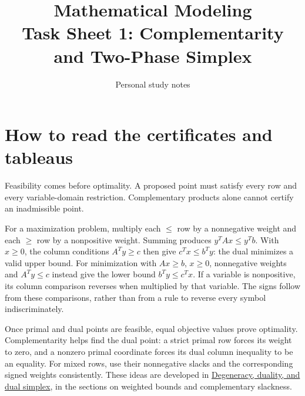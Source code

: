 \documentclass[11pt,a4paper]{article}
\title{\textbf{Mathematical Modeling}\\[2mm]
\large Task Sheet 1: Complementarity and Two-Phase Simplex}
\author{Personal study notes}
\date{}
\begin{document}
\maketitle
\tableofcontents

\section{How to read the certificates and tableaus}\label{sec:notation}
Feasibility comes before optimality. A proposed point must satisfy every row
and every variable-domain restriction. Complementary products alone cannot
certify an inadmissible point.

For a maximization problem, multiply each $\leq$ row by a nonnegative
weight and each $\geq$ row by a nonpositive weight. Summing produces
$y^TAx\leq y^Tb$. With $x\geq0$, the column conditions $A^Ty\geq c$
then give $c^Tx\leq b^Ty$: the dual minimizes a valid upper bound.
For minimization with $Ax\geq b$, $x\geq0$, nonnegative weights and
$A^Ty\leq c$ instead give the lower bound $b^Ty\leq c^Tx$.
If a variable is nonpositive, its column comparison reverses when multiplied
by that variable. The signs follow from these comparisons, rather than from
a rule to reverse every symbol indiscriminately.

Once primal and dual points are feasible, equal objective values prove
optimality. Complementarity helps find the dual point: a strict primal row
forces its weight to zero, and a nonzero primal coordinate forces its dual
column inequality to be an equality. For mixed rows, use their nonnegative
slacks and the corresponding signed weights consistently. These ideas are
developed in
\href{../lectures/04-degeneracy-and-duality.pdf}{Degeneracy, duality, and dual
  simplex}, in the sections on weighted bounds and complementary slackness.
\end{document}
